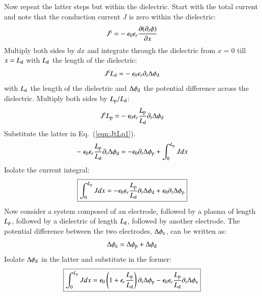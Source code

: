 \documentclass{warpdoc}
\newcommand\frameeqn[1]{\fbox{$\displaystyle #1$}}
\begin{document}
Now repeat the latter steps but within the dielectric. Start with the total current and note that the conduction current $J$ is zero within the dielectric:
%
\begin{equation}
 J^{\rm t} =
  -~\epsilon_0 \epsilon_r \frac{\partial (\partial_t \phi)}{\partial x}
\end{equation}
%
Multiply both sides by $dx$ and integrate through the dielectric from $x=0$ till $x=L_{\rm d}$ with $L_{\rm d}$ the length of the dielectric:
%
\begin{equation}
 J^{\rm t} L_{\rm d} =
  -~\epsilon_0 \epsilon_r \partial_t \Delta \phi_{\rm d}
\end{equation}
%
with $L_{\rm d}$ the length of the dielectric and $\Delta \phi_{\rm d}$ the potential difference across the dielectric. Multiply both sides by $L_{\rm p}/L_{\rm d}$:
%
\begin{equation}
 J^{\rm t} L_{\rm p} =
  -~\epsilon_0 \epsilon_r \frac{L_{\rm p}}{L_{\rm d}} \partial_t \Delta \phi_{\rm d} 
\label{eqn:JtLp2}
\end{equation}
%
Substitute the latter in Eq.\ (\ref{eqn:JtLp1}).
%
\begin{equation}
  -~\epsilon_0 \epsilon_r \frac{L_{\rm p}}{L_{\rm d}} \partial_t \Delta \phi_{\rm d} 
=
  - \epsilon_0  \partial_t \Delta \phi_{\rm p} 
+\int_0^{L_{\rm p}} J dx
\end{equation}
%
Isolate the current integral:
%
\begin{equation}
\frameeqn{
\int_0^{L_{\rm p}} J dx
=
  - \epsilon_0 \epsilon_r \frac{L_{\rm p}}{L_{\rm d}} \partial_t \Delta \phi_{\rm d} 
  + \epsilon_0  \partial_t \Delta \phi_{\rm p} 
}
\end{equation}
%
Now consider a system composed of an electrode, followed by a plasma of length $L_{\rm p}$, followed by a dielectric of length $L_{\rm d}$, followed by another electrode. The potential difference between the two electrodes, $\Delta \phi_{\rm e}$, can be written as: 
%
\begin{equation}
\Delta \phi_{\rm e}=\Delta \phi_{\rm p} + \Delta \phi_{\rm d}
\end{equation}
%
Isolate $\Delta \phi_{\rm d}$ in the latter and substitute in the former:
%
\begin{equation}
\frameeqn{
\int_0^{L_{\rm p}} J dx
=
    \epsilon_0 \left(1+\epsilon_r \frac{L_{\rm p}}{L_{\rm d}} \right) \partial_t \Delta \phi_{\rm p} 
  - \epsilon_0 \epsilon_r \frac{L_{\rm p}}{L_{\rm d}} \partial_t \Delta \phi_{\rm e} 
}
\end{equation}
%
\end{document}
